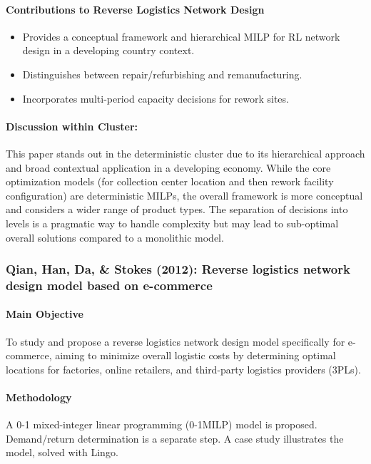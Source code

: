 \paragraph{Contributions to Reverse Logistics Network Design}
\begin{itemize}
    \item Provides a conceptual framework and hierarchical MILP for RL network design in a developing country context.
    \item Distinguishes between repair/refurbishing and remanufacturing.
    \item Incorporates multi-period capacity decisions for rework sites.
\end{itemize}
\paragraph{Discussion within Cluster:} This paper stands out in the deterministic cluster due to its hierarchical approach and broad contextual application in a developing economy. While the core optimization models (for collection center location and then rework facility configuration) are deterministic MILPs, the overall framework is more conceptual and considers a wider range of product types. The separation of decisions into levels is a pragmatic way to handle complexity but may lead to sub-optimal overall solutions compared to a monolithic model.

\subsubsection{Qian, Han, Da, \& Stokes (2012): Reverse logistics network design model based on e-commerce}
\paragraph{Main Objective} To study and propose a reverse logistics network design model specifically for e-commerce, aiming to minimize overall logistic costs by determining optimal locations for factories, online retailers, and third-party logistics providers (3PLs).
\paragraph{Methodology} A 0-1 mixed-integer linear programming (0-1MILP) model is proposed. Demand/return determination is a separate step. A case study illustrates the model, solved with Lingo.

